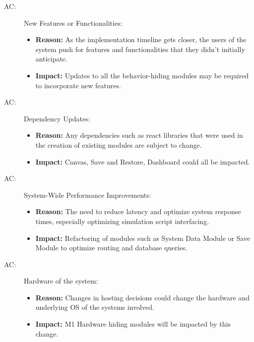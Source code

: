 \documentclass[12pt, titlepage]{article}
\newcounter{acnum}
\newcommand{\actheacnum}{AC\theacnum}
\begin{document}
\begin{description}
    \item  [ \actheacnum \label{acAuth}:]New Features or Functionalities:
    \begin{itemize}
        \item \textbf{Reason:} As the implementation timeline gets closer, the users of the system push for features and functionalities that they didn't initially anticipate.
      
        \item \textbf{Impact:} Updates to all the behavior-hiding modules may be required to incorporate new features.
    \end{itemize}

    \item  [ \actheacnum \label{acAuth}:]Dependency Updates:
    \begin{itemize}
        \item \textbf{Reason:} Any dependencies such as react libraries that were used in the creation of existing modules are subject to change. 
        \item \textbf{Impact:} Canvas, Save and Restore, Dashboard could all be impacted.
    \end{itemize}

    \item  [ \actheacnum \label{acAuth}:]System-Wide Performance Improvements:
    \begin{itemize}
        \item \textbf{Reason:} The need to reduce latency and optimize system response times, especially optimizing simulation script interfacing.
        \item \textbf{Impact:} Refactoring of modules such as System Data Module or Save Module to optimize routing and database queries.
    \end{itemize}

        \item [ \actheacnum \label{acAuth}:] Hardware of the system:
    \begin{itemize}
        \item \textbf{Reason:} Changes in hosting decisions could change the hardware and underlying OS of the systems involved.
        \item \textbf{Impact:} M1 Hardware hiding modules will be impacted by this change. 
    \end{itemize}

\end{description}
\end{document}
